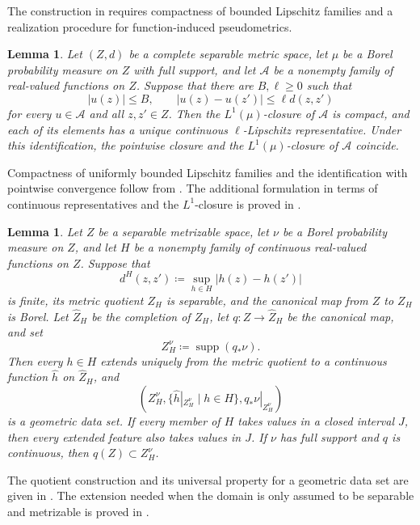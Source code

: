 \documentclass[10pt,a4paper]{amsart}
\newtheorem{lemma}[theorem]{Lemma}
\DeclareMathOperator{\supp}{supp}
\begin{document}
The construction in  requires compactness of bounded Lipschitz families and a realization procedure for function-induced pseudometrics.

\begin{lemma}
\label{lem:bounded-lipschitz-compactness}
Let $(Z,d)$ be a complete separable metric space, let $\mu$ be a Borel probability measure on $Z$ with full support, and let $\mathcal A$ be a nonempty family of real-valued functions on $Z$. Suppose that there are $B,\ell\geq0$ such that
\[|u(z)|\leq B,\qquad |u(z)-u(z')|\leq\ell d(z,z')\]
for every $u\in\mathcal A$ and all $z,z'\in Z$. Then the $L^1(\mu)$-closure of $\mathcal A$ is compact, and each of its elements has a unique continuous $\ell$-Lipschitz representative. Under this identification, the pointwise closure and the $L^1(\mu)$-closure of $\mathcal A$ coincide.
\end{lemma}

Compactness of uniformly bounded Lipschitz families and the identification with pointwise convergence follow from \cite[Lemma~2.2 and Remark~2.3]{hanika2022gds}. The additional formulation in terms of continuous representatives and the $L^1$-closure is proved in .

\begin{lemma}
\label{lem:feature-realization}
Let $Z$ be a separable metrizable space, let $\nu$ be a Borel probability measure on $Z$, and let $H$ be a nonempty family of continuous real-valued functions on $Z$. Suppose that
\[d^H(z,z')\coloneqq\sup_{h\in H}|h(z)-h(z')|\]
is finite, its metric quotient $Z_H$ is separable, and the canonical map from $Z$ to $Z_H$ is Borel. Let $\widehat Z_H$ be the completion of $Z_H$, let $q\colon Z\to\widehat Z_H$ be the canonical map, and set
\[Z_H^\nu\coloneqq\supp(q_*\nu).\]
Then every $h\in H$ extends uniquely from the metric quotient to a continuous function $\widehat h$ on $\widehat Z_H$, and
\[\left(Z_H^\nu,\{\widehat h|_{Z_H^\nu}\mid h\in H\},q_*\nu|_{Z_H^\nu}\right)\]
is a geometric data set. If every member of $H$ takes values in a closed interval $J$, then every extended feature also takes values in $J$. If $\nu$ has full support and $q$ is continuous, then $q(Z)\subset Z_H^\nu$.
\end{lemma}

The quotient construction and its universal property for a geometric data set are given in \cite[Definition~3.16, Proposition~3.17, Claim~3.18, and Proposition~3.19]{gds1}. The extension needed when the domain is only assumed to be separable and metrizable is proved in .
\end{document}
